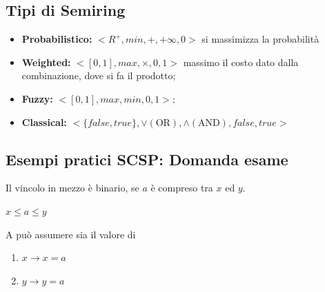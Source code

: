 \subsection{Tipi di Semiring}
\begin{itemize}
    \item \textbf{Probabilistico:} $< R^+ , min, +, +\infty, 0>$ si massimizza
          la probabilità
    \item \textbf{Weighted:} $<[0, 1], max, \times,0,1>$ massimo il costo dato dalla
          combinazione, dove si fa il prodotto;
    \item \textbf{Fuzzy:} $<[0,1],max,min,0,1>;$
    \item \textbf{Classical:} $<\{false,true\}, \lor(\text{OR}), \land(\text{AND}),
              false, true>$
\end{itemize}

\subsection{Esempi pratici SCSP: Domanda esame}
Il vincolo in mezzo è binario, se $a$ è compreso tra $x$ ed $y$.
\begin{center}
    $x \leq a \leq y$
\end{center}
A può assumere sia il valore di
\begin{enumerate}
    \item $x \rightarrow x = a$
    \item $y \rightarrow y = a$
\end{enumerate}

